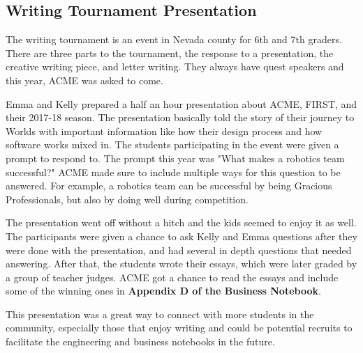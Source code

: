 \documentclass{article}
\begin{document}
\subsection{Writing Tournament Presentation}
The writing tournament is an event in Nevada county for 6th and 7th graders. There are three parts to the tournament, the response to a presentation, the creative writing piece, and letter writing. They always have quest speakers and this year, ACME was asked to come. 

Emma and Kelly prepared a half an hour presentation about ACME, FIRST, and  their 2017-18 season. The presentation basically told the story of their journey to Worlds with important information like how their design process and how software works mixed in. The students participating in the event were given a prompt to respond to. The prompt this year was "What makes a robotics team successful?" ACME made sure to include multiple ways for this question to be answered. For example, a robotics team can be successful by being Gracious Professionals, but also by doing well during competition. 

The presentation went off without a hitch and the kids seemed to enjoy it as well. The participants were given a chance to ask Kelly and Emma questions after they were done with the presentation, and had several in depth questions that needed answering. After that, the students wrote their essays, which were later graded by a group of teacher judges. ACME got a chance to read the essays and include some of the winning ones in \textbf{Appendix D of the Business Notebook}. 

This presentation was a great way to connect with more students in the community, especially those that enjoy writing and could be potential recruits to facilitate the engineering and business notebooks in the future. 
\end{document}
